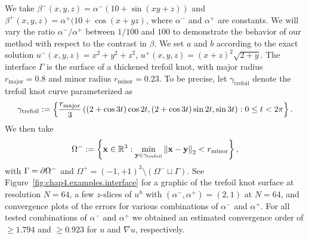 We take $\beta^-(x,y,z) = \alpha^- (10 + \sin(xy + z))$ and $\beta^+(x,y,z) = \alpha^+ (10 + \cos(x + yz)$, where $\alpha^-$ and $\alpha^+$ are constants. We will vary the ratio $\alpha^- / \alpha^+$ between $1/100$ and $100$ to demonstrate the behavior of our method with respect to the contrast in $\beta$. We set $a$ and $b$ according to the exact solution $u^-(x,y,z) = x^2 + y^2 + z^2$, $u^+(x,y,z) = (x + z)^2 \sqrt{2 + y}$. The interface $\Gamma$ is the surface of a thickened trefoil knot, with major radius $r_{\text{major}} = 0.8$ and minor radius $r_{\text{minor}} = 0.23$. To be precise, let $\gamma_{\text{trefoil}}$ denote the trefoil knot curve parameterized as
\begin{equation*}
\gamma_{\text{trefoil}} := \left\lbrace  \frac{r_{\text{major}}}{3} \left( (2 + \cos 3t) \cos 2t, (2 + \cos 3t) \sin 2t, \sin 3t \right) : 0 \leq t < 2\pi  \right\rbrace.
\end{equation*}
We then take
\begin{equation*}
\Omega^- := \left\lbrace  \mathbf{x} \in \mathbb{R}^3 : \min_{\mathbf{y} \in \gamma_{\text{trefoil}}} \left\lVert \mathbf{x} - \mathbf{y} \right\rVert_2 < r_{\text{minor}}  \right\rbrace,
\end{equation*}
with $\Gamma = \partial\Omega^-$ and $\Omega^+ = (-1,+1)^3 \setminus (\Omega^- \sqcup \Gamma)$. See Figure~\ref{fig:chap4.examples.interface} for a graphic of the trefoil knot surface at resolution $N = 64$, a few $z$-slices of $u^h$ with $(\alpha^-, \alpha^+) = (2,1)$ at $N = 64$, and convergence plots of the errors for various combinations of $\alpha^-$ and $\alpha^+$. For all tested combinations of $\alpha^-$ and $\alpha^+$ we obtained an estimated convergence order of $\geq 1.794$ and $\geq 0.923$ for $u$ and $\nabla u$, respectively.

